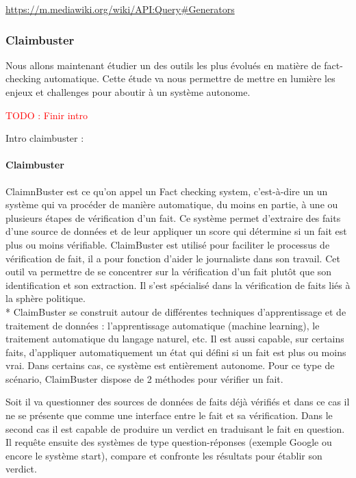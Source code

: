 \documentclass[12pt]{article}
\newcommand\todo[1]{\textcolor{red}{TODO : #1}}
\begin{document}
\url{https://m.mediawiki.org/wiki/API:Query#Generators}

\subsubsection{Claimbuster}

Nous allons maintenant étudier un des outils les plus évolués en matière de fact-checking automatique. Cette étude va nous permettre de mettre en lumière les enjeux et challenges pour aboutir à un système autonome.

\todo{Finir intro}

Intro claimbuster : \cite{hassan2015quest}

\paragraph{Claimbuster} \cite{hassan2017claimbuster}

ClaimnBuster est ce qu'on appel un Fact checking system, c'est-à-dire un un système qui va procéder de manière automatique, du moins en partie, à une ou plusieurs étapes de vérification d'un fait. Ce système permet d'extraire des faits d'une source de données et de leur appliquer un score qui détermine si un fait est plus ou moins vérifiable. ClaimBuster est utilisé pour faciliter le processus de vérification de fait, il a pour fonction d'aider le journaliste dans son travail. Cet outil va permettre de se concentrer sur la vérification d'un fait plutôt que son identification et son extraction. Il s'est spécialisé dans la vérification de faits liés à la sphère politique.
\\*
ClaimBuster se construit autour de différentes techniques d'apprentissage et de traitement de données : l'apprentissage automatique (machine learning), le traitement automatique du langage naturel, etc.
Il est aussi capable, sur certains faits, d'appliquer automatiquement un état qui défini si un fait est plus ou moins vrai. Dans certains cas, ce système est entièrement autonome. Pour ce type de scénario, ClaimBuster dispose de 2 méthodes pour vérifier un fait. 

Soit il va questionner des sources de données de faits déjà vérifiés et dans ce cas il ne se présente que comme une interface entre le fait et sa vérification. Dans le second cas il est capable de produire un verdict en traduisant le fait en question. Il requête ensuite des systèmes de type question-réponses (exemple Google ou encore le système start), compare et confronte les résultats pour établir son verdict.
\end{document}

